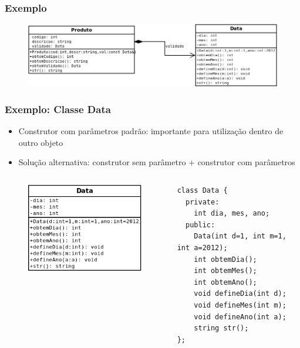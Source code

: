 \documentclass[aspectratio=169]{beamer}
\begin{document}
\begin{frame}\frametitle{Exemplo}
\begin{figure}[h]
	\centering
	\includegraphics[height=0.40\paperheight]{imagens/modelagem_produto_data.png}
\end{figure}
\end{frame}

\begin{frame}[fragile]\frametitle{Exemplo: Classe Data}
\begin{itemize}
	\item Construtor com parâmetros padrão: importante para utilização dentro de outro objeto
	\item Solução alternativa: construtor sem parâmetro + construtor com parâmetros
\end{itemize}
\begin{columns}[T]
\begin{column}{0.5\linewidth}
\begin{figure}[h]
	\centering
	\includegraphics[height=0.40\paperheight]{imagens/modelagem_data.png}
\end{figure}
\end{column}
\begin{column}{0.5\linewidth}
\begin{lstlisting}[basicstyle=\ttfamily\scriptsize]
class Data {
  private:
    int dia, mes, ano;
  public:
    Data(int d=1, int m=1, int a=2012);
    int obtemDia();
    int obtemMes();
    int obtemAno();
    void defineDia(int d);
    void defineMes(int m);
    void defineAno(int a);
    string str();
};
\end{lstlisting}
\end{column}
\end{columns}
\end{frame}
\end{document}
